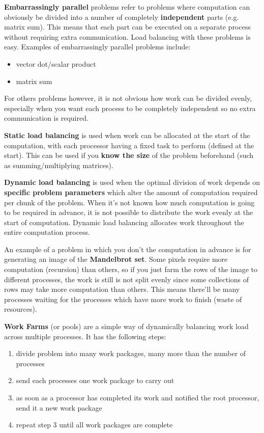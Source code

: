 \documentclass{article}
\begin{document}
\textbf{Embarrassingly parallel} problems refer to problems where computation can obviously be divided into a number of completely \textbf{independent} parts (e.g. matrix sum). This means that each part can be executed on a separate process without requiring extra communication. Load balancing with these problems is easy. Examples of embarrassingly parallel problems include:
\begin{itemize}
	\item vector dot/scalar product
	\item matrix sum
\end{itemize}

For others problems however, it is not obvious how work can be divided evenly, especially when you want each process to be completely independent so no extra communication is required.

\textbf{Static load balancing} is used when work can be allocated at the start of the computation, with each processor having a fixed task to perform (defined at the start). This can be used if you \textbf{know the size} of the problem beforehand (such as summing/multiplying matrices).

\textbf{Dynamic load balancing} is used when the optimal division of work depends on \textbf{specific problem parameters} which alter the amount of computation required per chunk of the problem. When it's not known how much computation is going to be required in advance, it is not possible to distribute the work evenly at the start of computation. Dynamic load balancing allocates work throughout the entire computation process.

An example of a problem in which you don't the computation in advance is for generating an image of the \textbf{Mandelbrot set}. Some pixels require more computation (recursion) than others, so if you just farm the rows of the image to different processes, the work is still is not split evenly since some collections of rows may take more computation than others. This means there'll be many processes waiting for the processes which have more work to finish (waste of resources).

\textbf{Work Farms} (or pools) are a simple way of dynamically balancing work load across multiple processes. It has the following steps:
\begin{enumerate}
	\item divide problem into many work packages, many more than the number of processes
	\item send each processes one work package to carry out
	\item as soon as a processor has completed its work and notified the root processor, send it a new work package
	\item repeat step 3 until all work packages are complete
\end{enumerate}
\end{document}
